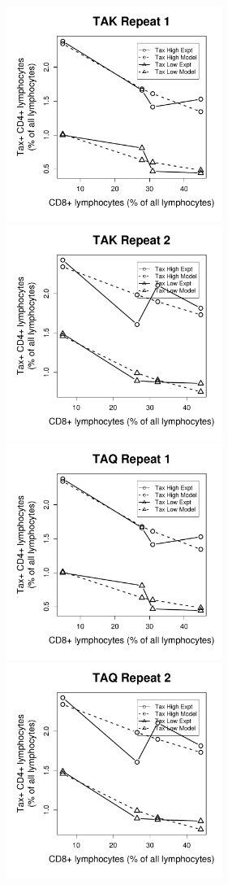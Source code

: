 \begin{figure}[htp]
\centering
\includegraphics[width=7cm]{./Figures/chapter5/figure_lysis_tak_rep_1}%
\hspace{0cm}%
\includegraphics[width=7cm]{./Figures/chapter5/figure_lysis_tak_rep_2} \\
\includegraphics[width=7cm]{./Figures/chapter5/figure_lysis_taq_rep_1}%
\hspace{0cm}%
\includegraphics[width=7cm]{./Figures/chapter5/figure_lysis_taq_rep_2} \\

\end{figure}
